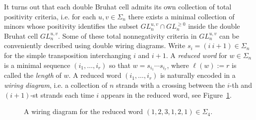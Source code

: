 \documentclass{amsart}
\theoremstyle{definition}
\theoremstyle{remark}
\numberwithin{equation}{section}
\begin{document}
    It turns out that each double Bruhat cell admits its own collection of total positivity criteria, i.e. for each $u,v\in\Sigma_n$ there exists a minimal collection of minors whose positivity identifies the subset $GL_n^{u,v}\cap GL_n^{\ge0}$ inside the double Bruhat cell $GL_n^{u,v}$.
    Some of these total nonnegativity criteria in $GL_n^{u,v}$ can be conveniently described using double wiring diagrams.  Write $s_i=(i\ i+1)\in\Sigma_n$ for the simple transposition interchanging $i$ and $i+1$.  A \emph{reduced word} for $w\in\Sigma_n$ is a minimal sequence $(i_1,\ldots,i_r)$ so that $w=s_{i_1}\cdots s_{i_r}$, where $\ell(w):=r$ is called the \emph{length} of $w$.  A reduced word $(i_1,\ldots,i_r)$ is naturally encoded in a \emph{wiring diagram}, i.e. a collection of $n$ strands with a crossing between the $i$-th and $(i+1)$-st strands each time $i$ appears in the reduced word, see Figure~\ref{fig:wiring diagram}.
    \begin{figure}[ht]
    \caption{A wiring diagram for the reduced word $(1,2,3,1,2,1)\in\Sigma_4$.}
    \label{fig:wiring diagram}
    \end{figure}
\end{document}
